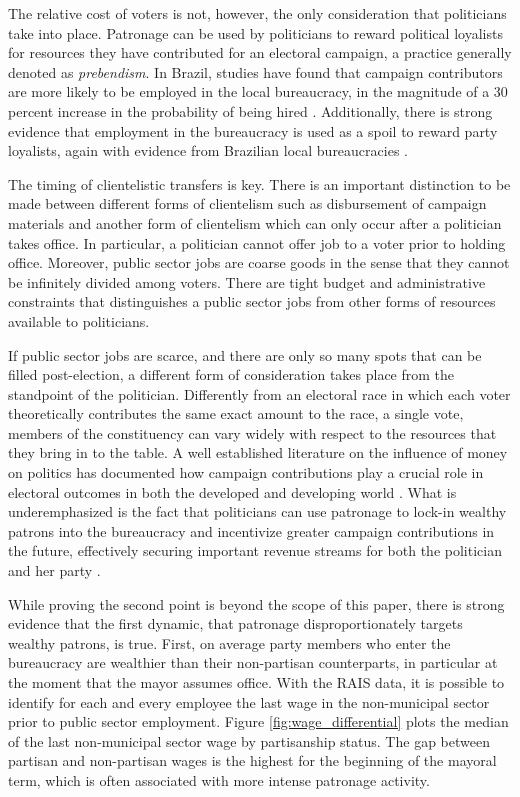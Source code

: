 \documentclass[12pt,a4paper]{article}
\begin{document}
The relative cost of voters is not, however, the only consideration that politicians take into place. Patronage can be used by politicians to reward political loyalists for resources they have contributed for an electoral campaign, a practice generally denoted as \emph{prebendism}\citep{van2007meet}. In Brazil, studies have found that campaign contributors are more likely to be employed in the local bureaucracy, in the magnitude of a 30 percent increase in the probability of being hired \citep{colonnelli2018patronage}. Additionally, there is strong evidence that employment in the bureaucracy is used as a spoil to reward party loyalists, again with evidence from Brazilian local bureaucracies \citep{brollo2017victor}.

The timing of clientelistic transfers is key. There is an important distinction to be made between different forms of clientelism such as disbursement of campaign materials \citep{stokes2005perverse,nichter2008vote} and another form of clientelism which can only occur after a politician takes office. In particular, a politician cannot offer job to a voter prior to holding office. Moreover, public sector jobs are coarse goods in the sense that they cannot be infinitely divided among voters. There are tight budget and administrative constraints that distinguishes a public sector jobs from other forms of resources available to politicians.

If public sector jobs are scarce, and there are only so many spots that can be filled post-election, a different form of consideration takes place from the standpoint of the politician. Differently from an electoral race in which each voter theoretically contributes the same exact amount to the race, a single vote, members of the constituency can vary widely with respect to the resources that they bring in to the table. A well established literature on the influence of money on politics has documented how campaign contributions play a crucial role in electoral outcomes in both the developed and developing world \citep{claessens2008political}. What is underemphasized is the fact that politicians can use patronage to lock-in wealthy patrons into the bureaucracy and incentivize greater campaign contributions in the future, effectively securing important revenue streams for both the politician and her party \citep{robinson2013political}.

While proving the second point is beyond the scope of this paper, there is strong evidence that the first dynamic, that patronage disproportionately targets wealthy patrons, is true. First, on average party members who enter the bureaucracy are wealthier than their non-partisan counterparts, in particular at the moment that the mayor assumes office. With the RAIS data, it is possible to identify for each and every employee the last wage in the non-municipal sector prior to public sector employment. Figure \ref{fig:wage_differential} plots the median of the last non-municipal sector wage by partisanship status. The gap between partisan and non-partisan wages is the highest for the beginning of the mayoral term, which is often associated with more intense patronage activity.
\end{document}
